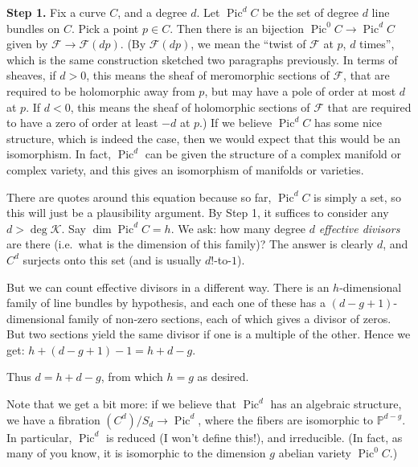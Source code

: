 \documentclass[12pt,letterpaper]{amsart}
\newcommand{\proj}{\mathbb P}
\newcommand{\cF}{{\mathcal{F}}}
\newcommand{\cK}{{\mathcal{K}}}
\newcommand{\Pic}{\operatorname{Pic}}
\begin{document}
{\noindent 
{\bf Step 1.}
Fix a  curve $C$, and a degree $d$.  Let $\Pic^d C$ be the set of
degree $d$ line bundles on $C$. Pick a point $p \in C$.  Then there is
an bijection $\Pic^0 C \rightarrow \Pic^d C$ given by $\cF \rightarrow
\cF(d p)$.  (By $\cF(d p)$, we mean the ``twist of $\cF$ at $p$, $d$
times'', which is the same construction sketched two paragraphs previously.
 In terms of sheaves, if $d>0$, this means the sheaf of
meromorphic sections of $\cF$, that are required to be holomorphic
away from $p$, but may have a pole of order at most $d$ at $p$.  If
$d<0$, this means the sheaf of holomorphic sections of $\cF$ that are
required to have a zero of order at least $-d$ at $p$.)  If we believe
$\Pic^d C$ has some nice structure, which is indeed the case, then we
would expect that this would be an isomorphism.  In fact, $\Pic^d$ can
be given the structure of a complex manifold or complex variety, and
this gives an isomorphism of manifolds or varieties.

\noindent {\bf Step 2: ``$\dim \Pic^d C = g$.''}  There are quotes
around this equation because so far, $\Pic^d C$ is simply a set, so
this will just be a plausibility argument.  By Step 1, it suffices to
consider any $d > \deg \cK$.  Say $\dim \Pic^d C = h$.  We ask: how
many degree $d$ {\em effective divisors} are there (i.e.\ what is the
dimension of this family)?  The answer is clearly $d$, and $C^d$
surjects onto this set (and is usually $d!$-to-$1$).

But we can count effective divisors in a different way.
There is an $h$-dimensional family of line bundles by hypothesis,
and each one of these has a $(d-g+1)$-dimensional family of
non-zero sections, each of which gives a divisor of zeros.  But two
sections yield the same divisor if one is a multiple of the other.
Hence we get: $h + (d-g+1) - 1 = h+d-g$.

Thus $d=h+d-g$, from which $h=g$ as desired.

Note that we get a bit more: if we believe that $\Pic^d$ has an
algebraic structure, we have a fibration $(C^d) / S_d \rightarrow
\Pic^d$, where the fibers are isomorphic to $\proj^{d-g}$.  In
particular, $\Pic^d$ is reduced (I won't define this!), and
irreducible.  (In fact, as many of you know, it is isomorphic to the
dimension $g$ abelian variety $\Pic^0 C$.)

}
\end{document}
